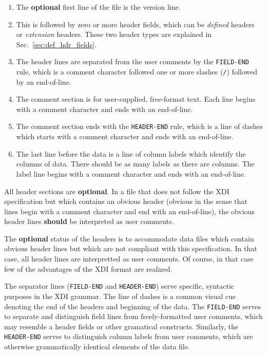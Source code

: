 \documentclass{article}
\newcommand{\xdi}{\textsf{XDI}}
\begin{document}
\begin{enumerate}
\item The \textbf{optional} first line of the file is the version
  line.
\item This is followed by zero or more header fields, which can be
  \textit{defined} headers or \textit{extension} headers.  These two
  header types are explained in Sec.~\ref{sec:def_hdr_fields}.
\item The header lines are separated from the user comments by the
  \texttt{FIELD-END} rule, which is a comment character followed one
  or more slashes (\texttt{/}) followed by an end-of-line.
\item The comment section is for user-supplied, free-format text.
  Each line begins with a comment character and ends with an
  end-of-line.
\item The comment section ends with the \texttt{HEADER-END} rule,
  which is a line of dashes which starts with a comment character and
  ends with an end-of-line.
\item The last line before the data is a line of column labels which
  identify the columns of data.  There should be as many labels as
  there are columns.  The label line begins with a comment character
  and ends with an end-of-line.
\end{enumerate}

All header sections are \textbf{optional}.  In a file that does not
follow the {\xdi} specification but which contains an obvious header
(obvious in the sense that lines begin with a comment character and
end with an end-of-line), the obvious header lines \textbf{should} be
interpreted as user comments.

The \textbf{optional} status of the headers is to accommodate data
files which contain obvious header lines but which are not compliant
with this specification.  In that case, all header lines are
interpretted as user comments.  Of course, in that case few of the
advantages of the {\xdi} format are realized.

The separator lines (\texttt{FIELD-END} and \texttt{HEADER-END}) serve
specific, syntactic purposes in the {\xdi} grammar.  The line of
dashes is a common visual cue denoting the end of the headers and
beginning of the data.  The \texttt{FIELD-END} serves to separate and
distinguish field lines from freely-formatted user comments, which may
resemble a header fields or other gramatical constructs.  Similarly,
the \texttt{HEADER-END} serves to distinguish column labels from user
comments, which are otherwise grammatically identical elements of the
data file.
\end{document}
